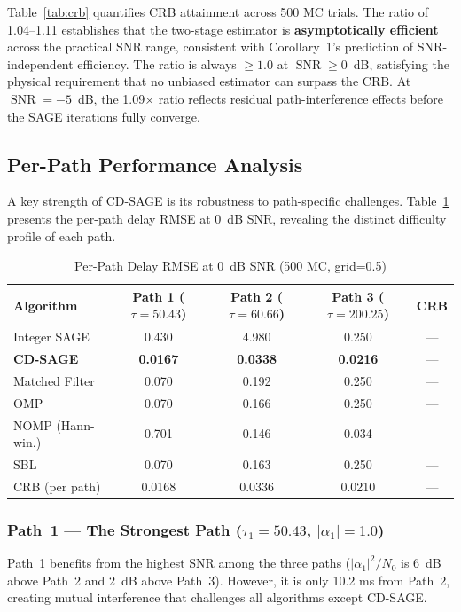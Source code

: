 \documentclass[a4paper,fleqn]{cas-dc}
\DeclareMathOperator{\SNR}{SNR}
\begin{document}
Table~\ref{tab:crb} quantifies CRB attainment across 500 MC trials. The ratio of 1.04--1.11 establishes that the two-stage estimator is \textbf{asymptotically efficient} across the practical SNR range, consistent with Corollary~1's prediction of SNR-independent efficiency. The ratio is always $\ge 1.0$ at $\SNR \ge 0$~dB, satisfying the physical requirement that no unbiased estimator can surpass the CRB. At $\SNR = -5$~dB, the 1.09$\times$ ratio reflects residual path-interference effects before the SAGE iterations fully converge.

\subsection{Per-Path Performance Analysis}

A key strength of CD-SAGE is its robustness to path-specific challenges. Table~\ref{tab:perpath} presents the per-path delay RMSE at 0~dB SNR, revealing the distinct difficulty profile of each path.

\begin{table}[width=.9\linewidth,cols=6,pos=h]
\centering
\caption{Per-Path Delay RMSE at 0~dB SNR (500 MC, grid=0.5)}
\label{tab:perpath}
\small
\begin{tabular*}{\tblwidth}{@{}lcccc@{}}
\toprule
Algorithm & Path 1 ($\tau{=}50.43$) & Path 2 ($\tau{=}60.66$) & Path 3 ($\tau{=}200.25$) & CRB \\
\midrule
Integer SAGE & 0.430 & 4.980 & 0.250 & --- \\
\textbf{CD-SAGE} & \textbf{0.0167} & \textbf{0.0338} & \textbf{0.0216} & --- \\
Matched Filter & 0.070 & 0.192 & 0.250 & --- \\
OMP & 0.070 & 0.166 & 0.250 & --- \\
NOMP (Hann-win.) & 0.701 & 0.146 & 0.034 & --- \\
SBL & 0.070 & 0.163 & 0.250 & --- \\
\midrule
CRB (per path) & 0.0168 & 0.0336 & 0.0210 & --- \\
\bottomrule
\end{tabular*}
\end{table}

\subsubsection{Path~1 --- The Strongest Path ($\tau_1 = 50.43$, $|\alpha_1| = 1.0$)}

Path~1 benefits from the highest SNR among the three paths ($|\alpha_1|^2 / N_0$ is 6~dB above Path~2 and 2~dB above Path~3). However, it is only 10.2 ms from Path~2, creating mutual interference that challenges all algorithms except CD-SAGE.
\end{document}
